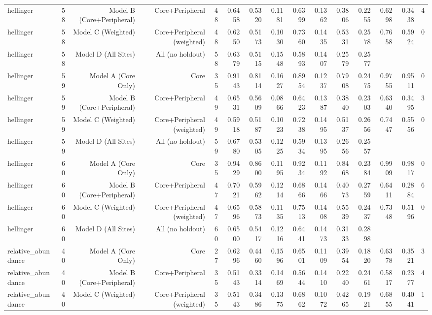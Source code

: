 {\begin{longtable}{lrrrrrrrrrrrrrr}
  hellinger & 58 & Model B (Core+Peripheral) & Core+Peripheral & 48 & 0.6458 & 0.5320 & 0.1181 & 0.6399 & 0.1362 & 0.3806 & 0.2255 & 0.6298 & 0.3438 & 4 \\
  hellinger & 58 & Model C (Weighted) & Core+Peripheral (weighted) & 48 & 0.6250 & 0.5173 & 0.1030 & 0.7360 & 0.1435 & 0.5331 & 0.2578 & 0.7658 & 0.5924 & 0 \\
  hellinger & 58 & Model D (All Sites) & All (no holdout) & 58 & 0.6379 & 0.5115 & 0.1548 & 0.5893 & 0.1407 & 0.2579 & 0.2577 &  &  &  \\
  hellinger & 59 & Model A (Core Only) & Core & 35 & 0.9143 & 0.8114 & 0.1627 & 0.8954 & 0.1237 & 0.7908 & 0.2475 & 0.9755 & 0.9511 & 0 \\
  hellinger & 59 & Model B (Core+Peripheral) & Core+Peripheral & 49 & 0.6531 & 0.5609 & 0.0866 & 0.6423 & 0.1387 & 0.3840 & 0.2303 & 0.6340 & 0.3495 & 3 \\
  hellinger & 59 & Model C (Weighted) & Core+Peripheral (weighted) & 49 & 0.5918 & 0.5187 & 0.1023 & 0.7238 & 0.1495 & 0.5137 & 0.2656 & 0.7447 & 0.5556 & 0 \\
  hellinger & 59 & Model D (All Sites) & All (no holdout) & 59 & 0.6780 & 0.5305 & 0.1225 & 0.5934 & 0.1395 & 0.2656 & 0.2557 &  &  &  \\
  hellinger & 60 & Model A (Core Only) & Core & 35 & 0.9429 & 0.8600 & 0.1195 & 0.9234 & 0.1192 & 0.8468 & 0.2384 & 0.9909 & 0.9817 & 0 \\
  hellinger & 60 & Model B (Core+Peripheral) & Core+Peripheral & 47 & 0.7021 & 0.5962 & 0.1214 & 0.6866 & 0.1466 & 0.4073 & 0.2759 & 0.6411 & 0.2884 & 6 \\
  hellinger & 60 & Model C (Weighted) & Core+Peripheral (weighted) & 47 & 0.6596 & 0.5873 & 0.1135 & 0.7513 & 0.1408 & 0.5539 & 0.2437 & 0.7348 & 0.5196 & 0 \\
  hellinger & 60 & Model D (All Sites) & All (no holdout) & 60 & 0.6500 & 0.5417 & 0.1216 & 0.6441 & 0.1473 & 0.3133 & 0.2898 &  &  &  \\
  relative\_abundance & 40 & Model A (Core Only) & Core & 27 & 0.6296 & 0.4460 & 0.1596 & 0.6501 & 0.1109 & 0.3954 & 0.1820 & 0.6378 & 0.3521 & 3 \\
  relative\_abundance & 40 & Model B (Core+Peripheral) & Core+Peripheral & 35 & 0.5143 & 0.3314 & 0.1469 & 0.5644 & 0.1410 & 0.2240 & 0.2461 & 0.5817 & 0.2377 & 4 \\
  relative\_abundance & 40 & Model C (Weighted) & Core+Peripheral (weighted) & 35 & 0.5143 & 0.3486 & 0.1375 & 0.6862 & 0.1072 & 0.4265 & 0.1921 & 0.6855 & 0.4041 & 1 \\

\end{longtable}}
